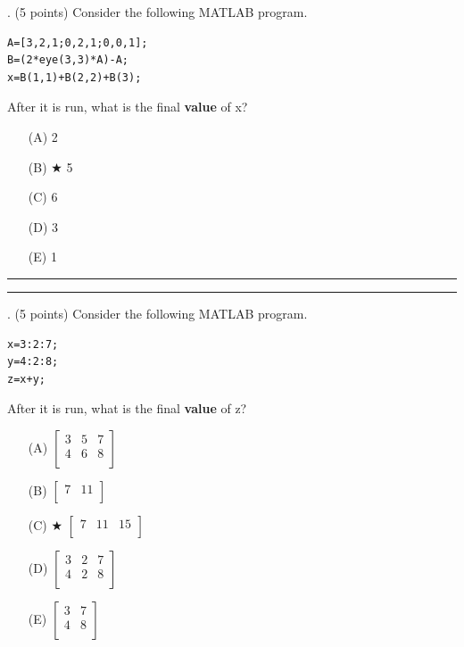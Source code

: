 \documentclass{article}
\begin{document}
\newpage
{}. (5 points)
Consider the following MATLAB program.
\begin{verbatim}
A=[3,2,1;0,2,1;0,0,1];
B=(2*eye(3,3)*A)-A;
x=B(1,1)+B(2,2)+B(3);
\end{verbatim}
After it is run, what is the final \textbf{value} of x?


\begin{enumerate}
\item[(A)]
2

\item[(B)] $\bigstar$ 
5

\item[(C)]
6

\item[(D)]
3

\item[(E)]
1

\end{enumerate}

\vspace*{2em}
\hrule
\vspace{2em}

\vspace{2em}
\hrule height 2pt


\newpage
{}. (5 points)
Consider the following MATLAB program.
\begin{verbatim}
x=3:2:7;
y=4:2:8;
z=x+y;
\end{verbatim}
After it is run, what is the final \textbf{value} of z?


\begin{enumerate}
\item[(A)]
$ \left[ \begin{array}{ccc} 3 & 5 & 7 \\ 4 & 6 & 8 \\ \end{array} \right] $

\item[(B)]
$ \left[ \begin{array}{ccccc} 7 & 11 \\ \end{array} \right] $

\item[(C)] $\bigstar$ 
$ \left[ \begin{array}{ccccc} 7 & 11 & 15 \\ \end{array} \right] $

\item[(D)]
$ \left[ \begin{array}{ccc} 3 & 2 & 7 \\ 4 & 2 & 8 \\ \end{array} \right] $

\item[(E)]
$ \left[ \begin{array}{cc} 3 & 7 \\ 4 & 8 \\ \end{array} \right] $

\end{enumerate}
\end{document}
